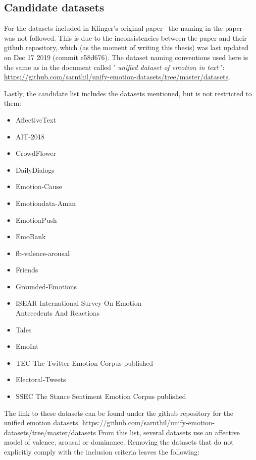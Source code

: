\subsection{Candidate datasets}\label{sub:Candidate datasets}
For the datasets included in Klinger's original paper~\cite{klinger2018analysis} the naming in the paper was not followed. This is due to the inconsistencies between the paper and their github repository, which (as the moment of writing this thesis) was last updated on Dec 17 2019 (commit e58d676). The dataset naming conventions used here is the same as in the document called ' \emph{unified dataset of emotion in text} ': \url{https://github.com/sarnthil/unify-emotion-datasets/tree/master/datasets}.

Lastly, the candidate list includes the datasets mentioned, but is not restricted to them:
\begin{itemize}
  \item AffectiveText~\cite{strapparava2007semeval} %
  \item AIT-2018~\cite{SemEval2018Task1} %
  \item CrowdFlower %
  \item DailyDialogs~\cite{li2017dailydialog}
  \item Emotion-Cause~\cite{ghazi2015detecting}
  \item Emotiondata-Aman~\cite{aman2007recognizing} %
  \item EmotionPush~\cite{huang2018emotionpush} %
  \item EmoBank~\cite{buechel2017emobank} %
  \item fb-valence-arousal~\cite{preoctiuc2016modelling} %
  \item Friends~\cite{chen2018emotionlines} %
  \item Grounded-Emotions~\cite{liu2017grounded} %
  \item ISEAR International Survey On Emotion \\ Antecedents And Reactions~\cite{scherer1990international} %
  \item Tales~\cite{alm2005emotions} %
  \item EmoInt~\cite{MohammadB17starsem}
  \item TEC The Twitter Emotion Corpus published~\cite{mohammad2012emotional}
  \item Electoral-Tweets~\cite{mohammad2014semantic}
  \item SSEC The Stance Sentiment Emotion Corpus published~\cite{schuff2017annotation}
\end{itemize}
The link to these datasets can be found under the github repository for the unified emotion datasets.
https://github.com/sarnthil/unify-emotion-datasets/tree/master/datasets
From this list, several datasets use an affective model of valence, arousal or dominance. Removing the datasets that do not explicitly comply with the inclusion criteria leaves the following:

